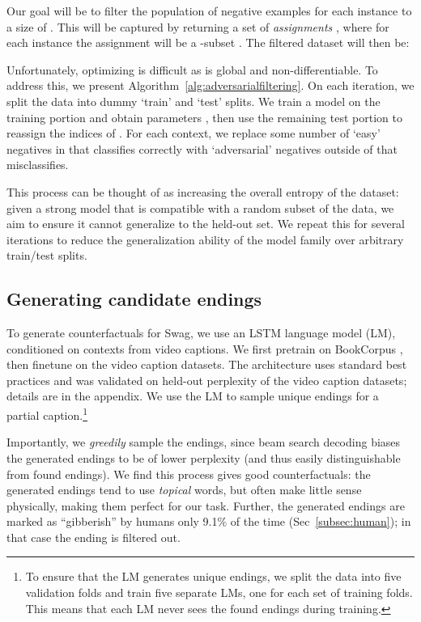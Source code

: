 \documentclass[11pt,a4paper]{article}
\newcommand\customfont[1]{{\usefont{T1}{perm}{m}{n}#1}}
\newcommand{\datasetname}{{\small\customfont{Swag}}}
\begin{document}
Our goal will be to filter the population of negative examples for each instance  to a size of . This will be captured by returning a set of \emph{assignments} , where for each instance the assignment will be a -subset . The filtered dataset will then be:
{\setlength{\abovedisplayskip}{4pt}
\setlength{\belowdisplayskip}{4pt}
\setlength{\abovedisplayshortskip}{0pt}
\setlength{\belowdisplayshortskip}{0pt}

}
Unfortunately, optimizing  is difficult as  is global and non-differentiable. To address this, we present Algorithm~\ref{alg:adversarialfiltering}. On each iteration, we split the data into dummy `train' and `test' splits. We train a model  on the training portion and obtain parameters , then use the remaining test portion to reassign the indices of . For each context, we replace some number of `easy' negatives in  that  classifies correctly with `adversarial' negatives outside of   that  misclassifies. 

This process can be thought of as increasing the overall entropy of the dataset: given a strong model  that is compatible with a random subset of the data, we aim to ensure it cannot generalize to the held-out set. We repeat this for several iterations to reduce the generalization ability of the model family  over arbitrary train/test splits.

\subsection{Generating candidate endings}
To generate counterfactuals for \datasetname, we use an LSTM \cite{Hochreiter:1997:LSM:1246443.1246450} language model (LM), conditioned on contexts from video captions. We first pretrain on BookCorpus \cite{moviebook}, then finetune on the video caption datasets. The architecture uses standard best practices and was validated on held-out perplexity of the video caption datasets; details are in the appendix. We use the LM to sample  unique endings for a partial caption.\footnote{To ensure that the LM generates unique endings, we split the data into five validation folds and train five separate LMs, one for each set of training folds. This means that each LM never sees the found endings during training.} 

Importantly, we \emph{greedily} sample the endings, since beam search decoding biases the generated endings to be of lower perplexity (and thus easily distinguishable from found endings). We find this process gives good counterfactuals: the generated endings tend to use \emph{topical} words, but often make little sense physically, making them perfect for our task. Further, the generated endings are marked as ``gibberish'' by humans only 9.1\% of the time (Sec~\ref{subsec:human}); in that case the ending is filtered out. 
\end{document}
